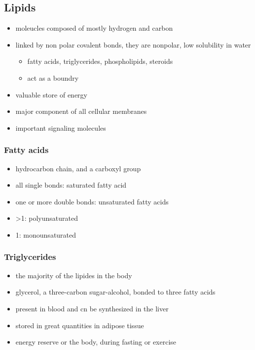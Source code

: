 \documentclass[11pt]{article}
\begin{document}
\subsection{Lipids}
\label{sec:orge141a01}
\begin{itemize}
\item moleucles composed of mostly hydrogen and carbon
\item linked by non polar covalent bonds, they are nonpolar, low solubility in water
\begin{itemize}
\item fatty acids, triglycerides, phospholipids, steroids
\item act as a boundry
\end{itemize}
\item valuable store of energy
\item major component of all cellular membranes
\item important signaling molecules
\end{itemize}
\subsubsection{Fatty acids}
\label{sec:orgfcf1564}
\begin{itemize}
\item hydrocarbon chain, and a carboxyl group
\item all single bonds: saturated fatty acid
\item one or more double bonds: unsaturated fatty acids
\item >1: polyunsaturated
\item 1: monounsaturated
\end{itemize}
\subsubsection{Triglycerides}
\label{sec:org3671308}
\begin{itemize}
\item the majority of the lipides in the body
\item glycerol, a three-carbon sugar-alcohol, bonded to three fatty acids
\item present in blood and cn be synthesized in the liver
\item stored in great quantities in adipose tissue
\item energy reserve or the body, during fasting or exercise
\end{itemize}
\end{document}
